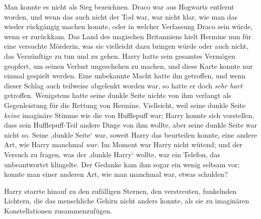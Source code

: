 Man konnte es nicht als Sieg bezeichnen. Draco war aus Hogwarts entfernt worden, und wenn das auch nicht der Tod war, war nicht klar, wie man das wieder rückgängig machen konnte, oder in welcher Verfassung Draco sein würde, wenn er zurückkam. Das Land des magischen Britanniens hielt Hermine nun für eine versuchte Mörderin, was sie vielleicht dazu bringen würde oder auch nicht, das Vernünftige zu tun und zu gehen. Harry hatte sein gesamtes Vermögen geopfert, um seinen Verlust ungeschehen zu machen, und diese Karte konnte nur einmal gespielt werden.
Eine unbekannte Macht hatte ihn getroffen, und wenn dieser Schlag auch teilweise abgelenkt worden war, so hatte er doch \emph{sehr hart} getroffen.
Wenigstens hatte seine dunkle Seite nichts von ihm verlangt als Gegenleistung für die Rettung von Hermine. Vielleicht, weil seine dunkle Seite \emph{keine} imaginäre Stimme wie die von Hufflepuff war; Harry konnte sich vorstellen, dass sein Hufflepuff-Teil andere Dinge von ihm wollte, aber seine dunkle Seite war nicht so. Seine ‚dunkle Seite‘ war, soweit Harry das beurteilen konnte, eine andere Art, wie Harry manchmal \emph{war}. Im Moment war Harry nicht wütend; und der Versuch zu fragen, was der ‚dunkle Harry‘ wollte, war ein Telefon, das unbeantwortet klingelte. Der Gedanke kam ihm sogar ein wenig seltsam vor; konnte man einer anderen Art, wie man manchmal war, etwas schulden?

Harry starrte hinauf zu den zufälligen Sternen, den verstreuten, funkelnden Lichtern, die das menschliche Gehirn nicht anders konnte, als sie zu imaginären Konstellationen zusammenzufügen.

